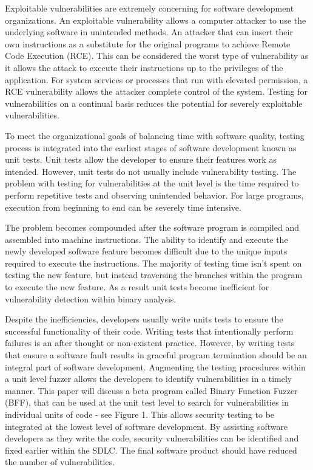 \documentclass[conference]{IEEEtran}
\begin{document}
Exploitable vulnerabilities are extremely concerning for software development organizations. An exploitable vulnerability allows a computer attacker to use the underlying software in unintended methods. An attacker that can insert their own instructions as a substitute for the original programs to achieve Remote Code Execution (RCE). This can be considered the worst type of vulnerability as it allows the attack to execute their instructions up to the privileges of the application. For system services or processes that run with elevated permission, a RCE vulnerability allows the attacker complete control of the system. Testing for vulnerabilities on a continual basis reduces the potential for severely exploitable vulnerabilities.

To meet the organizational goals of balancing time with software quality, testing process is integrated into the earliest stages of software development known as unit tests. Unit tests allow the developer to ensure their features work as intended. However, unit tests do not usually include vulnerability testing. The problem with testing for vulnerabilities at the unit level is the time required to perform repetitive tests and observing unintended behavior. For large programs, execution from beginning to end can be severely time intensive. 

The problem becomes compounded after the software program is compiled and assembled into machine instructions. The ability to identify and execute the newly developed software feature becomes difficult due to the unique inputs required to execute the instructions. The majority of testing time isn't spent on testing the new feature, but instead traversing the branches within the program to execute the new feature. As a result unit tests become inefficient for vulnerability detection within binary analysis.

Despite the inefficiencies, developers usually write units tests to ensure the successful functionality of their code. Writing tests that intentionally perform failures is an after thought or non-existent practice. However, by writing tests that ensure a software fault results in graceful program termination should be an integral part of software development. Augmenting the testing procedures within a unit level fuzzer allows the developers to identify vulnerabilities in a timely manner. This paper will discuss a beta program called Binary Function Fuzzer (BFF), that can be used at the unit test level to search for vulnerabilities in individual units of code - see Figure 1. This allows security testing to be integrated at the lowest level of software development. By assisting software developers as they write the code, security vulnerabilities can be identified and fixed earlier within the SDLC. The final software product should have reduced the number of vulnerabilities.
\end{document}

